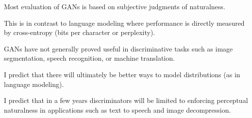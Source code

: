 {

Most evaluation of GANs is based on subjective judgments of naturalness.

\vfill
This is in contrast to language modeling where performance is directly measured by cross-entropy (bits per character or perplexity).


GANs have not generally proved useful in discriminative tasks such as image segmentation, speech recognition, or machine translation.

\vfill
I predict that there will ultimately be better ways to model distributions (as in language modeling).

\vfill
I predict that in a few years discriminators will be limited to enforcing perceptual naturalness in applications such as
text to speech and image decompression.


}

